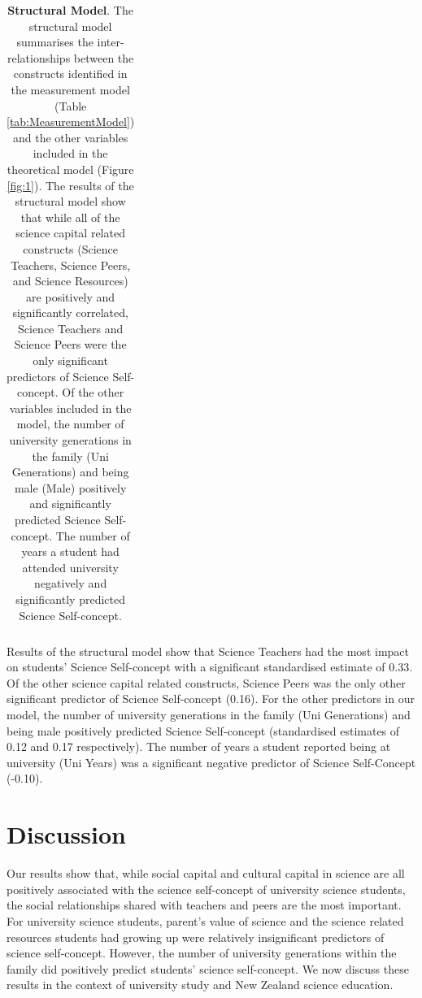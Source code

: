\begin{table}[ht]
\begin{tabular}{llrrrrr}
   \hline
\end{tabular}
\label{tab:StructuralModel}
\caption{\textbf{Structural Model}. The structural model summarises the inter-relationships between the constructs identified in the measurement model (Table \ref{tab:MeasurementModel}) and the other variables included in the theoretical model (Figure  \ref{fig:1}). The results of the structural model show that while all of the science capital related constructs (Science Teachers, Science Peers, and Science Resources) are positively and significantly correlated, Science Teachers and Science Peers were the only significant predictors of Science Self-concept. Of the other variables included in the model, the number of university generations in the family (Uni Generations) and being male (Male) positively and significantly predicted Science Self-concept. The number of years a student had attended university negatively and significantly predicted Science Self-concept.} 
\end{table}

Results of the structural model show that Science Teachers had the most impact on students' Science Self-concept with a significant standardised estimate of 0.33. Of the other science capital related constructs, Science Peers was the only other significant predictor of Science Self-concept (0.16). For the other predictors in our model, the number of university generations in the family (Uni Generations) and being male positively predicted Science Self-concept (standardised estimates of 0.12 and 0.17 respectively). The number of years a student reported being at university (Uni Years) was a significant negative predictor of Science Self-Concept (-0.10). 

\section*{Discussion}
\label{discussion}
Our results show that, while social capital and cultural capital in science are all positively associated with the science self-concept of university science students, the social relationships shared with teachers and peers are the most important. For university science students, parent's value of science and the science related resources students had growing up were relatively insignificant predictors of science self-concept. However, the number of university generations within the family did positively predict students' science self-concept. We now discuss these results in the context of university study and New Zealand science education.

